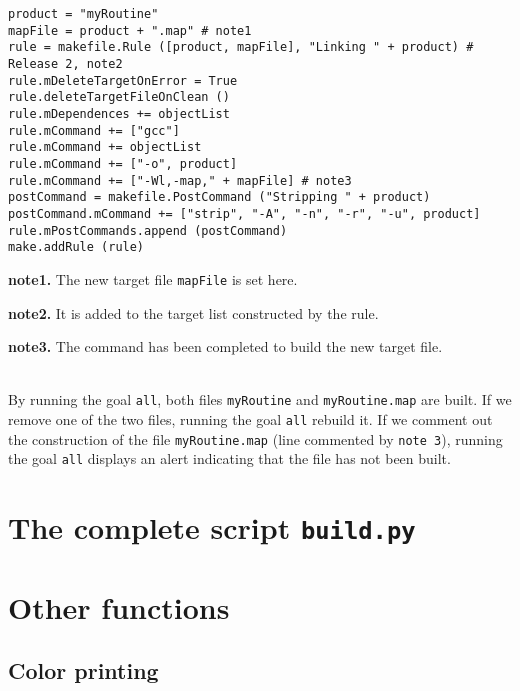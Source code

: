 \documentclass[a4paper,11pt]{extarticle}
\begin{document}
\begin{lstlisting}[language=Py]
product = "myRoutine"
mapFile = product + ".map" # note1
rule = makefile.Rule ([product, mapFile], "Linking " + product) # Release 2, note2
rule.mDeleteTargetOnError = True
rule.deleteTargetFileOnClean ()
rule.mDependences += objectList
rule.mCommand += ["gcc"]
rule.mCommand += objectList
rule.mCommand += ["-o", product]
rule.mCommand += ["-Wl,-map," + mapFile] # note3
postCommand = makefile.PostCommand ("Stripping " + product)
postCommand.mCommand += ["strip", "-A", "-n", "-r", "-u", product]
rule.mPostCommands.append (postCommand)
make.addRule (rule)
\end{lstlisting}

{\bf note1.} The new target file \texttt{mapFile} is set here.

{\bf note2.} It is added to the target list constructed by the rule.

{\bf note3.} The command has been completed to build the new target file.
\\~

By running the goal \texttt{all}, both files \texttt{myRoutine} and \texttt{myRoutine.map} are built. If we remove one of the two files, running the goal \texttt{all} rebuild it. If we comment out the construction of the file \texttt{myRoutine.map}  (line commented by \texttt{note 3}), running the goal \texttt{all} displays an alert indicating that the file has not been built.











\section{The complete script \texttt{build.py}}












\section{Other functions}

\subsection{Color printing}
\end{document}

